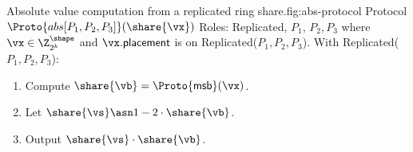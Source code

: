 \begin{Boxfig}{Absolute value computation from a replicated ring share.}{fig:abs-protocol}
  {Protocol $\Proto{abs[P_1, P_2, P_3]}(\share{\vx})$}
  Roles: Replicated, $P_1$, $P_2, P_3$ where $\vx \in \Z_{2^k}^\shape$ and
  $\vx.\mathsf{placement}$ is on Replicated($P_1, P_2, P_3$). \newline
  With Replicated($P_1, P_2, P_3$):
  \begin{enumerate}
    \item Compute $\share{\vb} = \Proto{\mathsf{msb}}(\vx)$.
    \item Let $\share{\vs} \asn 1 - 2 \cdot \share{\vb}$.
    \item Output $\share{\vs} \cdot \share{\vb}$.
  \end{enumerate}

\end{Boxfig}


